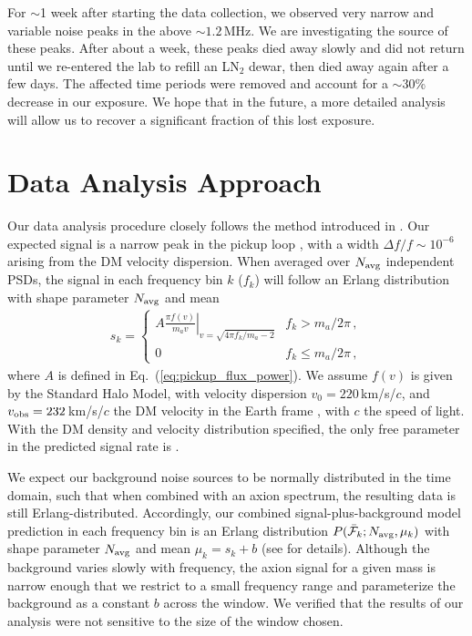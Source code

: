 \documentclass[aps,prl,amsmath,amssymb,reprint,superscriptaddress, nofootinbib,
]{revtex4-1}
\begin{document}
For $\sim$1 week after starting the data collection, we observed very narrow and variable noise peaks in the \PSD above $\sim1.2$\,MHz. We are investigating the source of these peaks. After about a week, these peaks died away slowly and did not return until we re-entered the lab to refill an LN$_2$ dewar, then died away again after a few days. The affected time periods were removed and account for a $\sim$30\% decrease in our exposure. We hope that in the future, a more detailed analysis will allow us to recover a significant fraction of this lost exposure.






 
\section{Data Analysis Approach}

Our data analysis procedure closely follows the method introduced in \cite{Foster2018}. Our expected signal is a narrow peak in the pickup loop \PSD, with a width $\Delta f/f\sim10^{-6}$ arising from the DM velocity dispersion. When averaged over $N_{\rm avg}$ independent PSDs, the signal in each frequency bin $k$ ($f_k$) will follow an Erlang distribution with shape parameter $N_{\rm avg}$ and mean
\begin{eqnarray}
s_k = 
\left\{ \begin{array}{lc}
A \left. \frac{\pi f(v)}{m_a v} \right|_{v = \sqrt{4\pi f_k/m_a - 2}} & f_k > m_a/2\pi\,, \\
0 & f_k \leq m_a/2\pi\,,
\end{array} \right.
\end{eqnarray}
where $A$ is defined in Eq.~(\ref{eq:pickup_flux_power}). We assume $f(v)$ is given by the Standard Halo Model, with velocity dispersion $v_0 = 220$\,km/s/$c$, and $v_{\rm obs} = 232$\,km/s/$c$ the DM velocity in the Earth frame \cite{McMillan:2009yr}, with $c$ the speed of light. With the DM density and velocity distribution specified, the only free parameter in the predicted signal rate is \gagg.

We expect our background noise sources to be normally distributed in the time domain, such that when combined with an axion spectrum, the resulting \PSD data is still Erlang-distributed.  Accordingly, our combined signal-plus-background model prediction in each frequency bin is an Erlang distribution $P(\bar{\mathcal{F}}_k; N_{\rm avg}, \mu_k)$ with shape parameter $N_{\rm avg}$ and mean $\mu_k = s_k + b$ (see \cite{Foster2018} for details). Although the background \PSD varies slowly with frequency, the axion signal for a given mass is narrow enough that we restrict to a small frequency range and parameterize the background as a constant $b$ across the window. We verified that the results of our analysis were not sensitive to the size of the window chosen.
\end{document}
